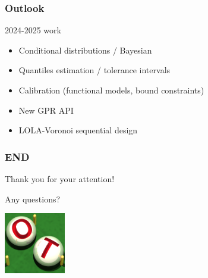 \documentclass[aspectratio=169]{beamer}
\begin{document}

\begin{frame}
\frametitle{Outlook}
\begin{block}{2024-2025 work}
\begin{itemize}
\item Conditional distributions / Bayesian
\item Quantiles estimation / tolerance intervals
\item Calibration (functional models, bound constraints)
\item New GPR API
\item LOLA-Voronoi sequential design
\end{itemize}
\end{block}
\end{frame}


\begin{frame}
\frametitle{END}

Thank you for your attention!

Any questions?

\begin{center}
\includegraphics[width=0.2\textwidth]{figures/logo-ot-small}
\end{center}

\end{frame}

% 
% 
% 
% 
\end{document}
